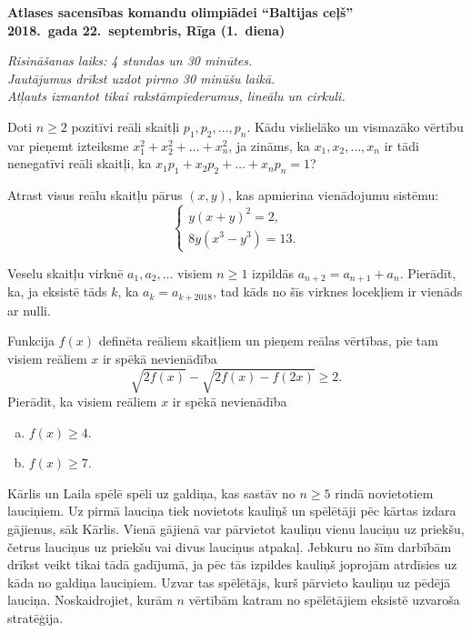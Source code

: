 \documentclass[11pt]{article}
\begin{document}
\begin{center}
{\Large \bf Atlases sacensības komandu olimpiādei ``Baltijas ceļš''}\\
{\bf 2018.\ gada 22.\ septembris, Rīga (1.\ diena)}
\end{center}

{\footnotesize \em 
Risināšanas laiks: 4 stundas un 30 minūtes.\\
Jautājumus drīkst uzdot pirmo 30 minūšu laikā.\\ 
Atļauts izmantot tikai rakstāmpiederumus, lineālu un cirkuli.
}

\begin{problem}[BW.TST.2018.1]
Doti $n \geq 2$ pozitīvi reāli skaitļi $p_1,p_2,\ldots,p_n$. Kādu vislielāko un 
vismazāko vērtību var pieņemt izteiksme $x_1^2 + x_2^2 + \ldots + x_n^2$, ja 
zināms, ka $x_1,x_2,\ldots,x_n$ ir tādi nenegatīvi reāli skaitļi, ka 
$x_1p_1 + x_2p_2 + \ldots + x_np_n = 1$? 
\end{problem}

\begin{problem}[BW.TST.2018.2]
Atrast visus reālu skaitļu pārus $(x,y)$, kas apmierina vienādojumu sistēmu: 
\[  \left\{ \begin{array}{l}
y(x+y)^2 = 2,\\
8y(x^3 - y^3) = 13.
\end{array} \right. \]
\end{problem}

\begin{problem}[BW.TST.2018.3]
Veselu skaitļu virknē $a_1,a_2,\ldots$ visiem $n \geq 1$ izpildās $a_{n+2} = a_{n+1} + a_n$. 
Pierādīt, ka, ja eksistē tāds $k$, ka $a_k = a_{k+2018}$, tad kāds no šīs virknes locekļiem 
ir vienāds ar nulli. 
\end{problem}

\begin{problem}[BW.TST.2018.4]
Funkcija $f(x)$ definēta reāliem skaitļiem un pieņem reālas vērtības, pie tam visiem reāliem $x$ ir spēkā
nevienādība
\[ \sqrt{2f(x)} - \sqrt{2f(x) - f(2x)} \geq 2. \]
Pierādīt, ka visiem reāliem $x$ ir spēkā nevienādība
\begin{enumerate}[(a)]
\item $f(x) \geq 4$.
\item $f(x) \geq 7$.
\end{enumerate}
\end{problem}


\begin{problem}[BW.TST.2018.5]
Kārlis un Laila spēlē spēli uz galdiņa, kas sastāv no $n \geq 5$ rindā
novietotiem lauciņiem. Uz pirmā lauciņa tiek novietots kauliņš un 
spēlētāji pēc kārtas izdara gājienus, sāk Kārlis.
Vienā gājienā var pārvietot kauliņu vienu lauciņu uz priekšu, četrus lauciņus uz 
priekšu vai divus lauciņus atpakaļ. 
Jebkuru no šīm darbībām drīkst veikt tikai tādā gadījumā, ja pēc tās izpildes 
kauliņš joprojām atrdīsies uz kāda no galdiņa lauciņiem. Uzvar tas spēlētājs, kurš pārvieto
kauliņu uz pēdējā lauciņa. 
Noskaidrojiet, kurām $n$ vērtībām katram no spēlētājiem eksistē uzvaroša stratēģija.
\end{problem}
\end{document}
